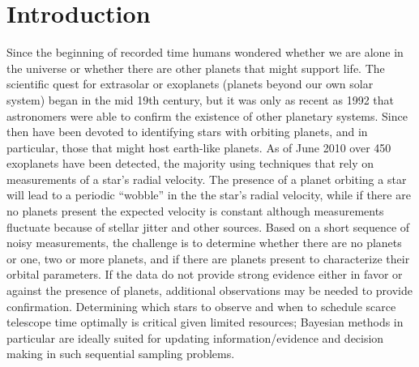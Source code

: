 \section{Introduction}

Since the beginning of recorded time humans wondered whether we are
alone in the universe or whether there are other planets that might
support life. The scientific quest for extrasolar or exoplanets
(planets beyond our own solar system) began in the mid 19th century,
but it was only as recent as 1992 that astronomers were  able to
confirm the existence of other planetary systems.  Since then
 have been devoted to
identifying stars with orbiting planets, and in particular, those that
might host earth-like planets. As of June 2010 over 450 exoplanets
have been detected, the majority using techniques that rely on
measurements of a star's radial velocity.  The presence of a planet
orbiting a star will lead to a periodic ``wobble'' in the the star's
radial velocity, while if there are no planets present the expected
velocity is constant although measurements fluctuate because of
stellar jitter and other sources.  Based on a short sequence
of noisy measurements, the challenge is to determine whether there are
no planets or one, two or more planets, and if there are planets
present to characterize their orbital parameters.  If the data do not
provide strong evidence either in favor or against the presence of
planets, additional observations may be needed to provide
confirmation.  Determining which stars to observe and when to schedule
scarce telescope time optimally is critical given limited resources;
Bayesian methods in particular are ideally suited for updating
information/evidence and decision making in such sequential sampling
problems.


